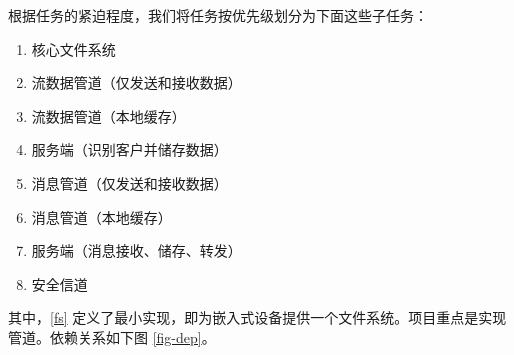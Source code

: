 \documentclass{ctexart}
\begin{document}
根据任务的紧迫程度，我们将任务按优先级划分为下面这些子任务：

\begin{enumerate}
	\item \label{fs} 核心文件系统
	\item \label{stream-send} 流数据管道（仅发送和接收数据）
	\item \label{stream-buffer} 流数据管道（本地缓存）
	\item \label{server-stream} 服务端（识别客户并储存数据）
	\item \label{msg-send} 消息管道（仅发送和接收数据）
	\item \label{msg-buffer} 消息管道（本地缓存）
	\item \label{server-msg} 服务端（消息接收、储存、转发）
	\item \label{security} 安全信道
\end{enumerate}

其中，\ref{fs} 定义了最小实现，即为嵌入式设备提供一个文件系统。项目重点是实现管道。依赖关系如下图 \ref{fig-dep}。
\end{document}
